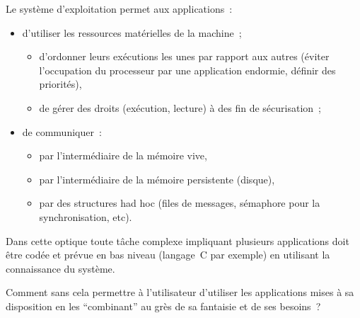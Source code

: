 \begin{frame}
  Le syst\`eme d'exploitation permet aux applications~:
  \begin{itemize}
  \item d'utiliser les ressources mat\'erielles de la machine~;
    \begin{itemize}
    \item d'ordonner leurs ex\'ecutions les unes par rapport aux
      autres (\'eviter l'occupation du processeur par une application
      endormie, d\'efinir des priorit\'es),
    \item de g\'erer des droits (ex\'ecution, lecture) \`a des fin de
      s\'ecurisation~;
    \end{itemize}
  \item de communiquer~:
    \begin{itemize}
    \item par l'interm\'ediaire de la m\'emoire vive,
    \item par l'interm\'ediaire de la m\'emoire persistente (disque),
    \item par des structures had hoc (files de messages, s\'emaphore
      pour la synchronisation, etc).
    \end{itemize}
  \end{itemize}
  Dans cette optique toute t\^ache complexe impliquant plusieurs
  applications doit \^etre cod\'ee et pr\'evue en bas niveau
  (langage~C par exemple) en utilisant la connaissance du syst\`eme.
  \par\smallskip
  Comment sans cela permettre \`a l'utilisateur d'utiliser les
  applications mises \`a sa disposition en les ``combinant'' au gr\`es
  de sa fantaisie et de ses besoins~?
\end{frame}
